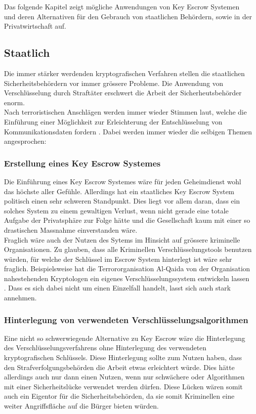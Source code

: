 Das folgende Kapitel zeigt mögliche Anwendungen von Key Escrow Systemen und deren Alternativen für den Gebrauch von staatlichen Behördern, sowie in der Privatwirtschaft auf.
	
	\subsection{Staatlich}
Die immer stärker werdenden kryptografischen Verfahren stellen die staatlichen Sicherheitsbehördern vor immer grössere Probleme. Die Anwendung von Verschlüsselung durch Straftäter erschwert die Arbeit der Sicherheutsbehörder enorm. \\
Nach terroristischen Anschlägen werden immer wieder Stimmen laut, welche die Einführung einer Möglichkeit zur Erleichterung der Entschlüsselung von Kommunikationsdaten fordern \cite{insideit} \cite{annabiselli} \cite{denning}. 
Dabei werden immer wieder die selbigen Themen angesprochen:

	\subsubsection{Erstellung eines Key Escrow Systemes}
Die Einführung eines Key Escrow Systemes wäre für jeden Geheimdienst wohl das höchste aller Gefühle. Allerdings hat ein staatliches Key Escrow System politisch einen sehr schweren Standpunkt. Dies liegt vor allem daran, dass ein solches System zu einem gewaltigen Verlust, wenn nicht gerade eine totale Aufgabe der Privatsphäre zur Folge hätte und die Gesellschaft kaum mit einer so drastischen Massnahme einverstanden wäre.\cite {insideit} \\
Fraglich wäre auch der Nutzen des Sytems im Hinsicht auf grössere kriminelle Organisationen. Zu glauben, dass alle Kriminellen Verschlüsselungstools benutzen würden, für welche der Schlüssel im Escrow System hinterlegt ist wäre sehr fraglich. Beispielsweise hat die Terrororganisation Al-Qaida von der Organisation nahestehenden Kryptologen ein eigenes Verschlüsselungssystem entwickeln lassen \cite{denning}. Dass es sich dabei nicht um einen Einzelfall handelt, lasst sich auch stark annehmen.
	
	\subsubsection{Hinterlegung von verwendeten Verschlüsselungsalgorithmen}
Eine nicht so schwerwiegende Alternative zu Key Escrow wäre die Hinterlegung des Verschlüsselungsverfahrens ohne Hinterlegung des verwendeten kryptografischen Schlüssels. Diese Hinterlegung sollte zum Nutzen haben, dass den Strafverfolgungsbehörden die Arbeit etwas erleichtert würde. Dies hätte allerdings auch nur dann einen Nutzen, wenn nur schwächere oder Algorithmen mit einer Sicherheitslücke verwendet werden dürfen. Diese Lücken wären somit auch ein Eigentor für die Sicherheitsbehörden, da sie somit Kriminellen eine weiter Angriffsfläche auf die Bürger bieten würden. \cite{adminch} %

